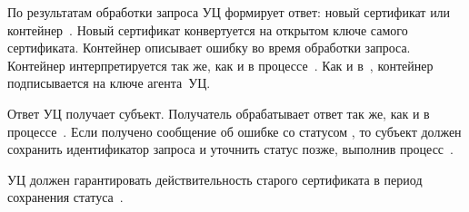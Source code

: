 По результатам обработки запроса УЦ формирует ответ: новый сертификат или
контейнер~. Новый сертификат конвертуется на открытом ключе
самого сертификата. Контейнер  описывает ошибку во время
обработки запроса. Контейнер интерпретируется так же, как и в
процессе~. Как и в~, контейнер подписывается на ключе
агента~УЦ.

Ответ УЦ получает субъект. Получатель обрабатывает ответ так же, как и в
процессе~.
%
Если получено сообщение об ошибке со статусом , то субъект должен
сохранить идентификатор запроса и уточнить статус позже, выполнив
процесс~.

УЦ должен гарантировать действительность старого сертификата в период сохранения
статуса~.
